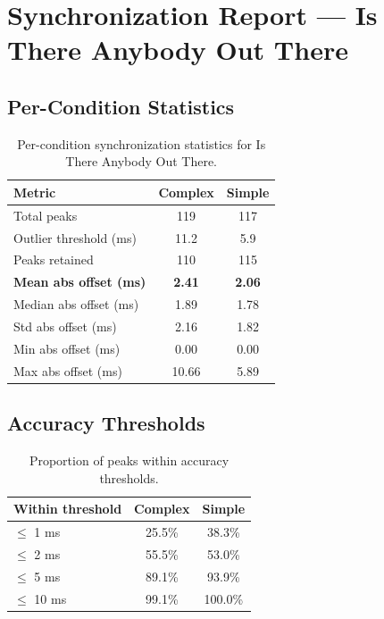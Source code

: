 
\section*{Synchronization Report --- Is There Anybody Out There}

\subsection*{Per-Condition Statistics}

\begin{table}[h!]
\centering
\begin{tabular}{|l|c|c|}
\hline
Metric & Complex & Simple \\
\hline
Total peaks & 119 & 117 \\
Outlier threshold (ms) & 11.2 & 5.9 \\
Peaks retained & 110 & 115 \\
\textbf{Mean abs offset (ms)} & \textbf{2.41} & \textbf{2.06} \\
Median abs offset (ms) & 1.89 & 1.78 \\
Std abs offset (ms) & 2.16 & 1.82 \\
Min abs offset (ms) & 0.00 & 0.00 \\
Max abs offset (ms) & 10.66 & 5.89 \\
\hline
\end{tabular}
\caption{Per-condition synchronization statistics for Is There Anybody Out There.}
\label{tab:sync_stats}
\end{table}

\subsection*{Accuracy Thresholds}

\begin{table}[h!]
\centering
\begin{tabular}{|l|c|c|}
\hline
Within threshold & Complex & Simple \\
\hline
$\leq$ 1 ms & 25.5\% & 38.3\% \\
$\leq$ 2 ms & 55.5\% & 53.0\% \\
$\leq$ 5 ms & 89.1\% & 93.9\% \\
$\leq$ 10 ms & 99.1\% & 100.0\% \\
\hline
\end{tabular}
\caption{Proportion of peaks within accuracy thresholds.}
\label{tab:sync_accuracy}
\end{table}

